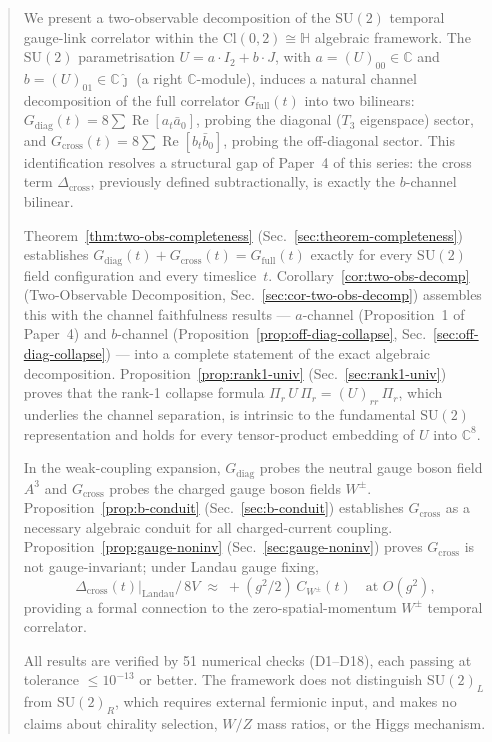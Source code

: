 \documentclass[12pt]{article}
\numberwithin{equation}{section}
\theoremstyle{plain}
\theoremstyle{definition}
\theoremstyle{remark}
\newcommand{\cl}{\mathrm{Cl}}              %
\newcommand{\su}{\mathrm{SU}}              %
\newcommand{\Cplx}{\mathbb{C}}             %
\newcommand{\HH}{\mathbb{H}}               %
\newcommand{\jhat}{\hat{\jmath}}           %
\newcommand{\Cjhat}{\Cplx\jhat}            %
\newcommand{\Gdiag}{G_{\mathrm{diag}}}     %
\newcommand{\Gcross}{G_{\mathrm{cross}}}   %
\newcommand{\Gfull}{G_{\mathrm{full}}}     %
\newcommand{\Dcross}{\Delta_{\mathrm{cross}}}  %
\newcommand{\Pir}{\Pi_{r}}                 %
\begin{document}
	\begin{abstract}
		We present a two-observable decomposition of the $\su(2)$ temporal
		gauge-link correlator within the $\cl(0,2)\cong\HH$ algebraic
		framework.  The $\su(2)$ parametrisation $U = a\cdot I_2 + b\cdot J$,
		with $a = (U)_{00}\in\Cplx$ and $b = (U)_{01}\in\Cjhat$ (a right
		$\Cplx$-module), induces a natural channel decomposition of the
		full correlator $\Gfull(t)$ into two bilinears:
		$\Gdiag(t) = 8\sum \operatorname{Re}[a_t\bar{a}_0]$, probing the
		diagonal ($T_3$ eigenspace) sector, and
		$\Gcross(t) = 8\sum \operatorname{Re}[b_t\bar{b}_0]$, probing the
		off-diagonal sector.  This identification resolves a structural
		gap of Paper~4 of this series: the cross term $\Dcross$, previously
		defined subtractionally, is exactly the $b$-channel bilinear.
		
		Theorem~\ref{thm:two-obs-completeness}
		(Sec.~\ref{sec:theorem-completeness}) establishes
		$\Gdiag(t) + \Gcross(t) = \Gfull(t)$ exactly for every $\su(2)$
		field configuration and every timeslice~$t$.
		Corollary~\ref{cor:two-obs-decomp} (Two-Observable Decomposition,
		Sec.~\ref{sec:cor-two-obs-decomp}) assembles this with the channel
		faithfulness results --- $a$-channel (Proposition~1 of Paper~4)
		and $b$-channel (Proposition~\ref{prop:off-diag-collapse},
		Sec.~\ref{sec:off-diag-collapse}) --- into a complete statement of
		the exact algebraic decomposition.
		Proposition~\ref{prop:rank1-univ} (Sec.~\ref{sec:rank1-univ})
		proves that the rank-1 collapse formula
		$\Pir\,U\,\Pir = (U)_{rr}\,\Pir$, which underlies the channel
		separation, is intrinsic to the fundamental $\su(2)$ representation
		and holds for every tensor-product embedding of $U$ into $\Cplx^8$.
		
		In the weak-coupling expansion, $\Gdiag$ probes the neutral gauge
		boson field $A^3$ and $\Gcross$ probes the charged gauge boson
		fields $W^{\pm}$.
		Proposition~\ref{prop:b-conduit} (Sec.~\ref{sec:b-conduit})
		establishes $\Gcross$ as a necessary algebraic conduit for all
		charged-current coupling.
		Proposition~\ref{prop:gauge-noninv} (Sec.~\ref{sec:gauge-noninv})
		proves $\Gcross$ is not gauge-invariant; under Landau gauge fixing,
		\[
		\Dcross(t)\big|_{\mathrm{Landau}}\big/\,8V
		\;\approx\; +(g^2/2)\,C_{W^{\pm}}(t)
		\quad\text{at } O(g^2),
		\]
		providing a formal connection to the zero-spatial-momentum
		$W^{\pm}$ temporal correlator.
		
		All results are verified by 51 numerical checks (D1--D18), each
		passing at tolerance $\leq 10^{-13}$ or better.  The framework
		does not distinguish $\su(2)_L$ from $\su(2)_R$, which requires
		external fermionic input, and makes no claims about chirality
		selection, $W/Z$ mass ratios, or the Higgs mechanism.
	\end{abstract}
	
\end{document}
